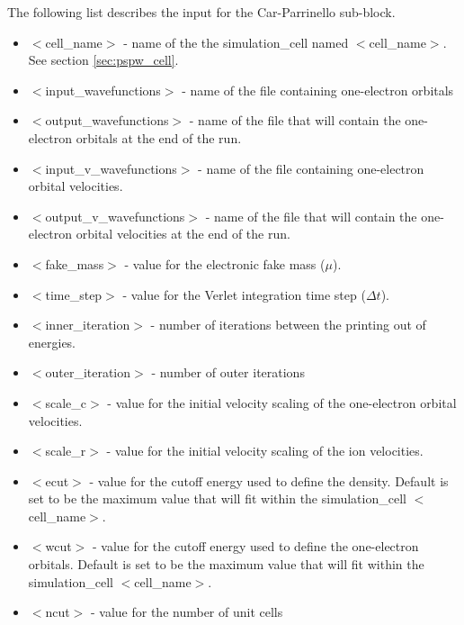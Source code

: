 The following list describes the input for the Car-Parrinello
sub-block.
\begin{itemize}
        \item $<$cell\_name$>$ - name of the
              the simulation\_cell named $<$cell\_name$>$.  See section \ref{sec:pspw_cell}.
        \item $<$input\_wavefunctions$>$ - name of the 
              file containing one-electron orbitals
        \item $<$output\_wavefunctions$>$ - name of the
              file that will contain the one-electron orbitals at the
              end of the run. 
        \item $<$input\_v\_wavefunctions$>$ - name of the file
              containing one-electron orbital velocities.
        \item $<$output\_v\_wavefunctions$>$ - name of the
              file that will contain the one-electron orbital velocities
              at the end of the run. 
        \item $<$fake\_mass$>$ - value for the electronic
              fake mass ($\mu$).
        \item $<$time\_step$>$ - value for the Verlet integration 
               time step ($\Delta t$).
        \item $<$inner\_iteration$>$ - number of iterations between the
              printing out of energies.
        \item $<$outer\_iteration$>$ - number of outer iterations
        \item $<$scale\_c$>$ - value for the initial velocity
                              scaling of the one-electron orbital velocities.
        \item $<$scale\_r$>$ - value for the initial velocity
                              scaling of the ion velocities.
        \item $<$ecut$>$ - value for the cutoff energy used
                           to define the density.  Default is set
                           to be the maximum value that will fit
                           within the simulation\_cell $<$cell\_name$>$.
        \item $<$wcut$>$ - value for the cutoff energy used
                           to define the one-electron orbitals.  Default is set
                           to be the maximum value that will fit
                           within the simulation\_cell $<$cell\_name$>$.
        \item $<$ncut$>$ - value for the number of unit cells

\end{itemize}

